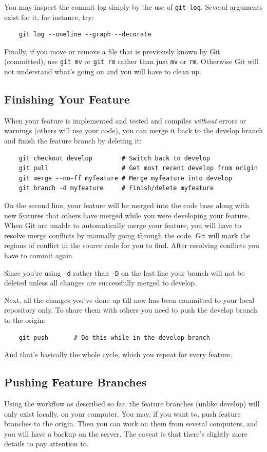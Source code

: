 \documentclass[10pt,a4paper]{article}
\begin{document}
You may inspect the commit log simply by the use of \verb$git log$. Several arguments exist for it, for instance, try:

\begin{verbatim}
	git log --oneline --graph --decorate
\end{verbatim}

Finally, if you move or remove a file that is previously known by Git (committed), use \verb$git mv$ or \verb$git rm$ rather than just \verb$mv$ or \verb$rm$. Otherwise Git will not understand what's going on and you will have to clean up.

\subsection{Finishing Your Feature}
When your feature is implemented and tested and compiles \emph{without} errors or warnings (others will use your code), you can merge it back to the develop branch and finish the feature branch by deleting it:

\begin{verbatim}
	git checkout develop        # Switch back to develop
	git pull                    # Get most recent develop from origin
	git merge --no-ff myfeature # Merge myfeature into develop
	git branch -d myfeature     # Finish/delete myfeature
\end{verbatim}
On the second line, your feature will be merged into the code base along with new features that others have merged while you were developing your feature. When Git are unable to automatically merge your feature, you will have to resolve merge conflicts by manually going through the code. Git will mark the regions of conflict in the source code for you to find. After resolving conflicts you have to commit again.

Since you're using \verb$-d$ rather than \verb$-D$ on the last line your branch will not be deleted unless all changes are successfully merged to develop.

Next, all the changes you've done up till now has been committed to your local repository only. To share them with others you need to push the develop branch to the origin:

\begin{verbatim}
	git push	   # Do this while in the develop branch
\end{verbatim}
And that's basically the whole cycle, which you repeat for every feature.

\subsection{Pushing Feature Branches}
Using the workflow as described so far, the feature branches (unlike develop) will only exist locally, on your computer. You may, if you want to, push feature branches to the origin. Then you can work on them from several computers, and you will have a backup on the server. The caveat is that there's slightly more details to pay attention to.
\end{document}
